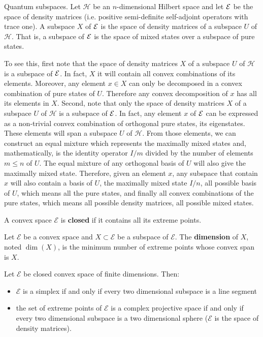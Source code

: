 \begin{example} Quantum subspaces.
	Let $\mathcal{H}$ be an $n$-dimensional Hilbert space and let $\mathcal{E}$ be the space of density matrices (i.e. positive semi-definite self-adjoint operators with trace one). A subspace $X$ of $\mathcal{E}$ is the space of density matrices of a subspace $U$ of $\mathcal{H}$. That is, a subspace of $\mathcal{E}$ is the space of mixed states over a subspace of pure states.
	
	To see this, first note that the space of density matrices $X$ of a subspace $U$ of $\mathcal{H}$ is a subspace of $\mathcal{E}$. In fact, $X$ it will contain all convex combinations of its elements. Moreover, any element $x \in X$ can only be decomposed in a convex combination of pure states of $U$. Therefore any convex decomposition of $x$ has all its elements in $X$. Second, note that only the space of density matrices $X$ of a subspace $U$ of $\mathcal{H}$ is a subspace of $\mathcal{E}$. In fact, any element $x$ of $\mathcal{E}$ can be expressed as a non-trivial convex combination of orthogonal pure states, its eigenstates. These elements will span a subspace $U$ of $\mathcal{H}$. From those elements, we can construct an equal mixture which represents the maximally mixed states and, mathematically, is the identity operator $I/m$ divided by the number of elements $m \leq n$ of $U$. The equal mixture of any orthogonal basis of $U$ will also give the maximally mixed state. Therefore, given an element $x$, any subspace that contain $x$ will also contain a basis of $U$, the maximally mixed state $I/n$, all possible basis of $U$, which means all the pure states, and finally all convex combinations of the pure states, which means all possible density matrices, all possible mixed states.
\end{example}

\begin{defn}
	A convex space $\mathcal{E}$ is \textbf{closed} if it contains all its extreme points.
\end{defn}

\begin{defn}
	Let $\mathcal{E}$ be a convex space and $X \subset \mathcal{E}$ be a subspace of $\mathcal{E}$. The \textbf{dimension} of $X$, noted $\dim(X)$, is the minimum number of extreme points whose convex span is $X$.
\end{defn}

\begin{conj}
	Let $\mathcal{E}$ be closed convex space of finite dimensions. Then:
	\begin{itemize}
		\item $\mathcal{E}$ is a simplex if and only if every two dimensional subspace is a line segment
		\item the set of extreme points of $\mathcal{E}$ is a complex projective space if and only if every two dimensional subspace is a two dimensional sphere ($\mathcal{E}$ is the space of density matrices).
	\end{itemize}
\end{conj}

